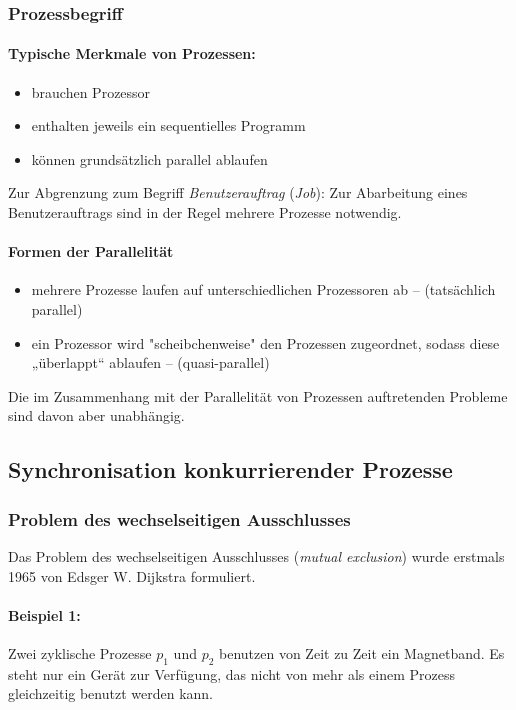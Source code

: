 \documentclass[11pt]{article}
\begin{document}
\subsubsection*{Prozessbegriff}
\label{sec:orgec149ba}
\paragraph*{Typische Merkmale von Prozessen:}
\label{sec:org9886e81}
\begin{itemize}
\item brauchen Prozessor
\item enthalten jeweils ein sequentielles Programm
\item können grundsätzlich parallel ablaufen
\end{itemize}

Zur Abgrenzung zum Begriff \emph{Benutzerauftrag} (\emph{Job}): Zur Abarbeitung
eines Benutzerauftrags sind in der Regel mehrere Prozesse notwendig.

\paragraph*{Formen der Parallelität}
\label{sec:orgb4f4dd8}
\begin{itemize}
\item mehrere Prozesse laufen auf unterschiedlichen Prozessoren ab --
(tatsächlich parallel)

\item ein Prozessor wird "scheibchenweise" den Prozessen zugeordnet, sodass
diese „überlappt“ ablaufen --
(quasi-parallel)
\end{itemize}

Die im Zusammenhang mit der Parallelität von Prozessen auftretenden
Probleme sind davon aber unabhängig.
\subsection*{Synchronisation konkurrierender Prozesse}
\label{sec:org7a36ce2}
\subsubsection*{Problem des wechselseitigen Ausschlusses}
\label{sec:org62d9dad}
Das Problem des wechselseitigen Ausschlusses (\emph{mutual exclusion}) wurde
erstmals 1965 von Edsger W. Dijkstra formuliert.

\paragraph*{Beispiel 1:}
\label{sec:orgf8dab81}
Zwei zyklische Prozesse \(p_1\) und \(p_2\) benutzen von Zeit zu Zeit ein
Magnetband. Es steht nur ein Gerät zur Verfügung, das nicht von mehr als
einem Prozess gleichzeitig benutzt werden kann.
\end{document}
